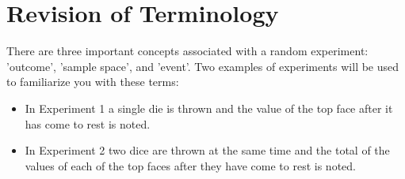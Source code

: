     
 \label{m39377*uid4}
            \section{ Revision of Terminology}
            \nopagebreak
            
        
        
        \label{m39377*eip-499}There are three important concepts associated with a
random experiment: 'outcome', 'sample space', and 'event'. Two examples of
experiments will be used to familiarize you with these terms:\par \label{m39377*id110091}\begin{itemize}[noitemsep]
            \label{m39377*uid5}\item In Experiment
1 a single die is thrown and the value of the top face after it has come to rest
is noted.
\label{m39377*uid6}\item In Experiment 2 two dice are thrown at the same time
and the total of the values of each of the top faces after they have come to
rest is noted.
\end{itemize}
        
